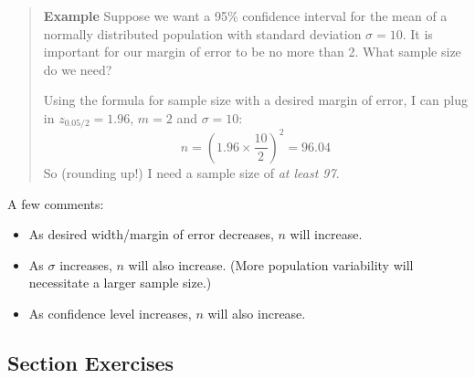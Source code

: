 \documentclass[
]{book}
\providecommand{\tightlist}{%
  \setlength{\itemsep}{0pt}\setlength{\parskip}{0pt}}
\begin{document}
\begin{quote}
\textbf{Example} Suppose we want a 95\% confidence interval for the mean of a normally distributed population with standard deviation \(\sigma=10\). It is important for our margin of error to be no more than 2. What sample size do we need?

Using the formula for sample size with a desired margin of error, I can plug in \(z_{0.05/2}=1.96\), \(m=2\) and \(\sigma=10\): \[n = \left(1.96\times\frac{10}{2}\right)^2 = 96.04\] So (rounding up!) I need a sample size of \emph{at least 97}.
\end{quote}

A few comments:

\begin{itemize}
\tightlist
\item
  As desired width/margin of error decreases, \(n\) will increase.
\item
  As \(\sigma\) increases, \(n\) will also increase. (More population variability will necessitate a larger sample size.)
\item
  As confidence level increases, \(n\) will also increase.
\end{itemize}

\subsection*{Section Exercises}\label{section-exercises-19}
\end{document}
